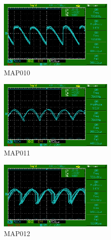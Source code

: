 \begin{figure}
    \centering
    \includegraphics[width=0.5\textwidth]{bilder/MAP010.png}
    \caption{MAP010}        
    \label{fig:MAP010}
\end{figure}

\begin{figure}
    \centering
    \includegraphics[width=0.5\textwidth]{bilder/MAP011.png}
    \caption{MAP011}        
    \label{fig:MAP011}
\end{figure}

\begin{figure}
    \centering
    \includegraphics[width=0.5\textwidth]{bilder/MAP012.png}
    \caption{MAP012}        
    \label{fig:MAP012}
\end{figure}
